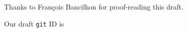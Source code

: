 \documentclass{ecai}
\begin{document}
\ack Thanks to François Bancilhon for proof-reading this draft.



\begin{flushright}
  \begin{relsize}{-1}
    Our draft \texttt{git} ID is \texttt{\textit{\rpsgitcommit}}
  \end{relsize}
\end{flushright}
\end{document}
